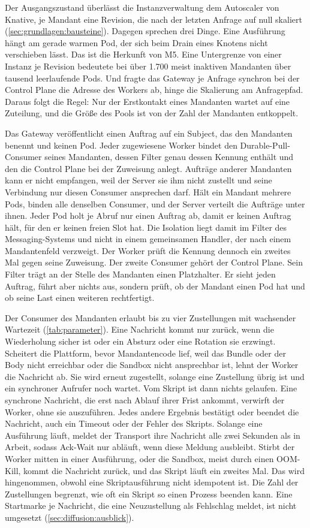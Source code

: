 Der Ausgangszustand überlässt die Instanzverwaltung dem Autoscaler von Knative, je Mandant eine Revision, die nach
der letzten Anfrage auf null skaliert (\autoref{sec:grundlagen:bausteine}). Dagegen sprechen drei Dinge. Eine
Ausführung hängt am gerade warmen Pod, der sich beim Drain eines Knotens nicht verschieben lässt. Das ist die Herkunft
von M5. Eine Untergrenze von einer Instanz je Revision bedeutete bei über 1.700 meist inaktiven Mandanten über tausend
leerlaufende Pods. Und fragte das Gateway je Anfrage synchron bei der Control Plane die Adresse des Workers ab,
hinge die Skalierung am Anfragepfad. Daraus folgt die Regel:
Nur der Erstkontakt eines Mandanten wartet auf eine Zuteilung, und die Größe des Pools ist von der Zahl der Mandanten entkoppelt.

Das Gateway veröffentlicht einen Auftrag auf ein Subject, das den Mandanten benennt und keinen Pod. Jeder zugewiesene Worker bindet den Durable-Pull-Consumer seines Mandanten, dessen Filter genau
dessen Kennung enthält und den die Control Plane bei der Zuweisung anlegt. Aufträge anderer Mandanten kann er
nicht empfangen, weil der Server sie ihm nicht zustellt und seine Verbindung nur diesen Consumer ansprechen darf. Hält
ein Mandant mehrere Pods, binden alle denselben Consumer, und der Server verteilt die Aufträge unter ihnen.
Jeder Pod holt je Abruf nur einen Auftrag ab, damit er keinen Auftrag hält, für den er keinen freien Slot hat. Die
Isolation liegt damit im Filter des Messaging-Systems und nicht in einem gemeinsamen Handler, der nach einem
Mandantenfeld verzweigt. Der Worker prüft die Kennung dennoch ein zweites Mal gegen seine Zuweisung. Der zweite
Consumer gehört der Control Plane. Sein Filter trägt an der Stelle des Mandanten einen Platzhalter. Er sieht jeden
Auftrag, führt aber nichts aus, sondern prüft, ob der Mandant einen Pod hat und ob seine Last einen weiteren
rechtfertigt.

Der Consumer des Mandanten erlaubt bis zu vier Zustellungen mit wachsender Wartezeit (\autoref{tab:parameter}). Eine Nachricht kommt
nur zurück, wenn die Wiederholung sicher ist oder ein Absturz oder eine Rotation sie erzwingt. Scheitert die Plattform, bevor Mandantencode
lief, weil das Bundle oder der Body nicht erreichbar oder die Sandbox nicht ansprechbar ist, lehnt der Worker die
Nachricht ab. Sie wird erneut zugestellt, solange eine Zustellung übrig ist und ein synchroner Aufrufer noch wartet.
Vom Skript ist dann nichts gelaufen. Eine synchrone Nachricht, die erst nach Ablauf ihrer Frist ankommt,
verwirft der Worker, ohne sie auszuführen. Jedes andere Ergebnis bestätigt oder beendet die Nachricht, auch ein Timeout oder der Fehler des
Skripts. Solange eine Ausführung läuft, meldet der Transport ihre Nachricht alle zwei Sekunden als in Arbeit, sodass
Ack-Wait nur abläuft, wenn diese Meldung ausbleibt. Stirbt der Worker mitten in einer Ausführung, oder die Sandbox, meist durch einen \ac{OOM}-Kill, kommt die Nachricht
zurück, und das Skript läuft ein zweites Mal. Das wird hingenommen, obwohl eine Skriptausführung nicht idempotent ist.
Die Zahl der Zustellungen begrenzt, wie oft ein Skript so einen Prozess beenden kann. Eine Startmarke je Nachricht,
die eine Neuzustellung als Fehlschlag meldet, ist nicht umgesetzt (\autoref{sec:diffusion:ausblick}).

